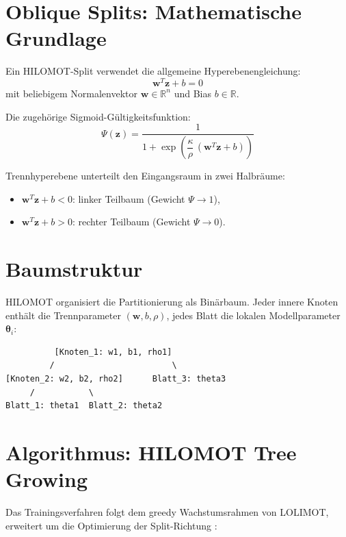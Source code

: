 \documentclass[11pt,a4paper]{report}
\begin{document}
\section{Oblique Splits: Mathematische Grundlage}
\label{sec:hilomot_oblique}

Ein HILOMOT-Split verwendet die allgemeine Hyperebenengleichung:
\begin{equation}
\mathbf{w}^T\mathbf{z} + b = 0
\label{eq:oblique_hyperplane}
\end{equation}
mit beliebigem Normalenvektor $\mathbf{w} \in \mathbb{R}^n$ und Bias $b \in \mathbb{R}$.

Die zugeh\"{o}rige Sigmoid-G\"{u}ltigkeitsfunktion:
\begin{equation}
\Psi(\mathbf{z}) = \frac{1}{1 + \exp\!\left(\dfrac{\kappa}{\rho}\,(\mathbf{w}^T\mathbf{z}+b)\right)}
\end{equation}

Trennhyperebene unterteilt den Eingangsraum in zwei Halbr\"{a}ume:
\begin{itemize}
\item $\mathbf{w}^T\mathbf{z} + b < 0$: linker Teilbaum (Gewicht $\Psi \to 1$),
\item $\mathbf{w}^T\mathbf{z} + b > 0$: rechter Teilbaum (Gewicht $\Psi \to 0$).
\end{itemize}

\section{Baumstruktur}

HILOMOT organisiert die Partitionierung als Bin\"{a}rbaum. Jeder innere Knoten enth\"{a}lt die
Trennparameter $(\mathbf{w}, b, \rho)$, jedes Blatt die lokalen Modellparameter
$\boldsymbol{\theta}_i$:
\begin{center}
\begin{verbatim}
          [Knoten_1: w1, b1, rho1]
         /                        \
[Knoten_2: w2, b2, rho2]      Blatt_3: theta3
     /           \
Blatt_1: theta1  Blatt_2: theta2
\end{verbatim}
\end{center}

\section{Algorithmus: HILOMOT Tree Growing}
\label{sec:hilomot_algorithm}

Das Trainingsverfahren folgt dem greedy Wachstumsrahmen von LOLIMOT, erweitert um die
Optimierung der Split-Richtung \cite{nelles2001}:
\end{document}

